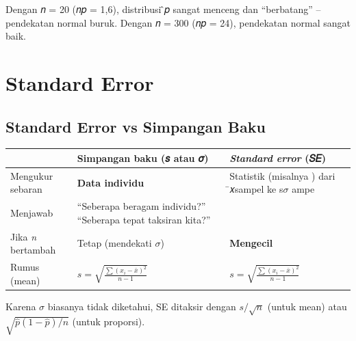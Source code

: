 \documentclass[
  indonesian,
  letterpaper,
]{book}
\newcounter{none} %
\begin{document}
Dengan 𝑛 = 20 (𝑛𝑝 = 1,6), distribusi ̂𝑝 sangat menceng dan ``berbatang''
-- pendekatan normal buruk. Dengan 𝑛 = 300 (𝑛𝑝 = 24), pendekatan normal
sangat baik.


\chapter{Standard Error}\label{standard-error}

\section{Standard Error vs Simpangan
Baku}\label{standard-error-vs-simpangan-baku}

{\def\LTcaptype{none} %
\begin{longtable}[]{@{}
  >{\raggedright\arraybackslash}p{}
  >{\raggedright\arraybackslash}p{}
  >{\raggedright\arraybackslash}p{}@{}}
\toprule\noalign{}
\begin{minipage}[b]{\linewidth}\raggedright
\end{minipage} & \begin{minipage}[b]{\linewidth}\raggedright
Simpangan baku (𝑠 atau 𝜎)
\end{minipage} & \begin{minipage}[b]{\linewidth}\raggedright
\emph{Standard error} (𝑆𝐸)
\end{minipage} \\
\midrule\noalign{}
\endhead
\bottomrule\noalign{}
\endlastfoot
Mengukur sebaran & \textbf{Data individu} & Statistik (misalnya ) dari
̄𝑥sampel ke s\(\sigma\) ampe \\
Menjawab & ``Seberapa beragam individu?'' ``Seberapa tepat taksiran
kita?'' & \\
Jika \emph{n} bertambah & Tetap (mendekati \(\sigma\)) &
\textbf{Mengecil} \\
Rumus (mean) & \(s = \sqrt{\frac{\sum (x_i - \bar{x})^2}{n - 1}}\) &
\(s = \sqrt{\frac{\sum (x_i - \bar{x})^2}{n - 1}}\) \\
\end{longtable}
}

Karena \(\sigma\) biasanya tidak diketahui, SE ditaksir dengan
\(s/\sqrt{n}\) (untuk mean) atau \(\sqrt{\hat{p}(1-\hat{p})/n}\) (untuk
proporsi).
\end{document}
